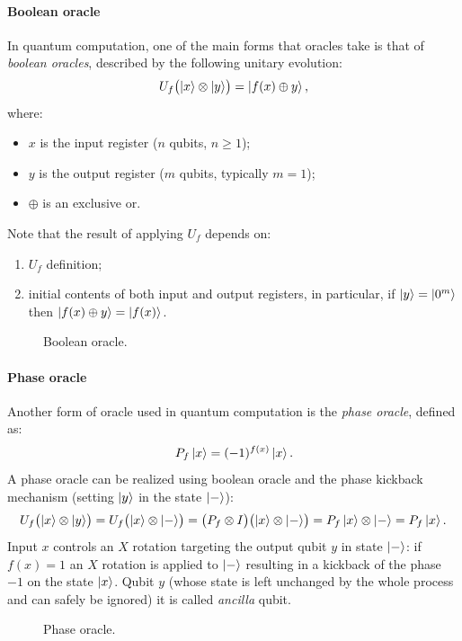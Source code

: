 \documentclass{article}
\begin{document}
\paragraph{Boolean oracle}
In quantum computation, one of the main forms that oracles take is that of
\emph{boolean oracles}, described by the following unitary evolution:
\[
  U_f \bigl( \ket{x} \otimes \ket{y} \bigr) =  \ket{f(x) \oplus y},
\]
where:
\begin{itemize}
  \item
  $x$ is the input register ($n$ qubits, $n \geq 1$);
  \item
  $y$ is the output register ($m$ qubits, typically $m = 1$);
  \item
  $\oplus$ is an exclusive or.
\end{itemize}
Note that the result of applying $U_f$ depends on:
\begin{enumerate}
  \item
  $U_f$ definition;
  \item
  initial contents of both input and output registers, in particular,
  if $\ket{y} = \ket{0^m}$ then $\ket{f(x) \oplus y} = \ket{f(x)}$.
\end{enumerate}
\begin{figure}[H]
  \centering
  
  \caption{Boolean oracle.}
\end{figure}

\paragraph{Phase oracle}
Another form of oracle used in quantum computation is the \emph{phase oracle},
defined as:
\[
  P_f \ket{x} = (-1)^{f(x)} \ket{x}.
\]
A phase oracle can be realized using boolean oracle and the phase kickback
mechanism (setting $\ket{y}$ in the state $\ket{-}$):
\[
  U_f \bigl( \ket{x} \otimes \ket{y} \bigr)
  = U_f \bigl( \ket{x} \otimes \ket{-} \bigr)
  = \bigl( P_f \otimes  I \bigr) \bigl( \ket{x} \otimes \ket{-} \bigr)
  = P_f \ket{x} \otimes \ket{-}
  = P_f \ket{x}.
\]
Input $x$ controls an $X$ rotation targeting the output qubit $y$ in state
$\ket{-}$:
if $f(x) = 1$ an $X$ rotation is applied to $\ket{-}$ resulting in a kickback
of the phase $-1$ on the state $\ket{x}$.
Qubit $y$ (whose state is left unchanged by the whole
process and can safely be ignored) it is called \emph{ancilla} qubit.
\begin{figure}[H]
  \centering
  
  \caption{Phase oracle.}
\end{figure}
\end{document}
